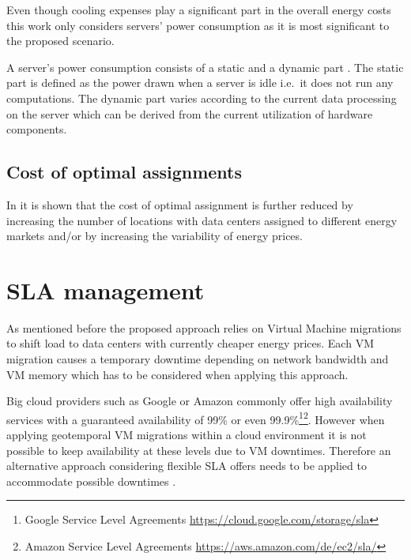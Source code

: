 Even though cooling expenses play a significant part in the overall energy costs this work only considers servers' power consumption as it is most significant to the proposed scenario. 

A server's power consumption consists of a static and a dynamic part \cite{liu2013performance}. The static part is defined as the power drawn when a server is idle i.e.~it does not run any computations. The dynamic part varies according to the current data processing on the server which can be derived from the current utilization of hardware components. 


\subsection{Cost of optimal assignments}


In \cite{de2013study} it is shown that the cost of optimal assignment is further reduced by increasing the number of locations with data centers assigned to different energy markets and/or by increasing the variability of energy prices. 






\section{SLA management}

As mentioned before the proposed approach relies on Virtual Machine migrations to shift load to data centers with currently cheaper energy prices. Each VM migration causes a temporary downtime depending on network bandwidth and VM memory \cite{liu2013performance} which has to be considered when applying this approach. 

Big cloud providers such as Google or Amazon commonly offer high availability services with a guaranteed availability of 99\% or even 99.9\%\footnote{Google Service Level Agreements \url{https://cloud.google.com/storage/sla}}\footnote{Amazon Service Level Agreements \url{https://aws.amazon.com/de/ec2/sla/}}. However when applying geotemporal VM migrations within a cloud environment it is not possible to keep availability at these levels due to VM downtimes. Therefore an alternative approach considering flexible SLA offers needs to be applied to accommodate possible downtimes \cite{luvcanin2014energy}. 


